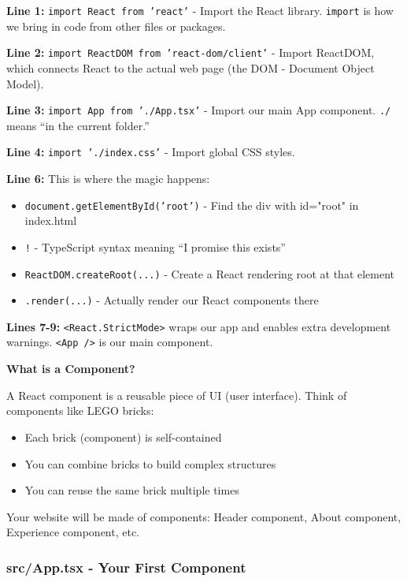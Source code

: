 \documentclass[12pt,a4paper]{article}
\begin{document}
\begin{explanation}
\textbf{Line 1:} \texttt{import React from 'react'} - Import the React library. \texttt{import} is how we bring in code from other files or packages.

\textbf{Line 2:} \texttt{import ReactDOM from 'react-dom/client'} - Import ReactDOM, which connects React to the actual web page (the DOM - Document Object Model).

\textbf{Line 3:} \texttt{import App from './App.tsx'} - Import our main App component. \texttt{./} means ``in the current folder.''

\textbf{Line 4:} \texttt{import './index.css'} - Import global CSS styles.

\textbf{Line 6:} This is where the magic happens:
\begin{itemize}
    \item \texttt{document.getElementById('root')} - Find the div with id="root" in index.html
    \item \texttt{!} - TypeScript syntax meaning ``I promise this exists''
    \item \texttt{ReactDOM.createRoot(...)} - Create a React rendering root at that element
    \item \texttt{.render(...)} - Actually render our React components there
\end{itemize}

\textbf{Lines 7-9:} \texttt{<React.StrictMode>} wraps our app and enables extra development warnings. \texttt{<App />} is our main component.
\end{explanation}

\begin{concept}
\textbf{What is a Component?}

A React component is a reusable piece of UI (user interface). Think of components like LEGO bricks:
\begin{itemize}
    \item Each brick (component) is self-contained
    \item You can combine bricks to build complex structures
    \item You can reuse the same brick multiple times
\end{itemize}

Your website will be made of components: Header component, About component, Experience component, etc.
\end{concept}

\subsubsection{src/App.tsx - Your First Component}
\end{document}
